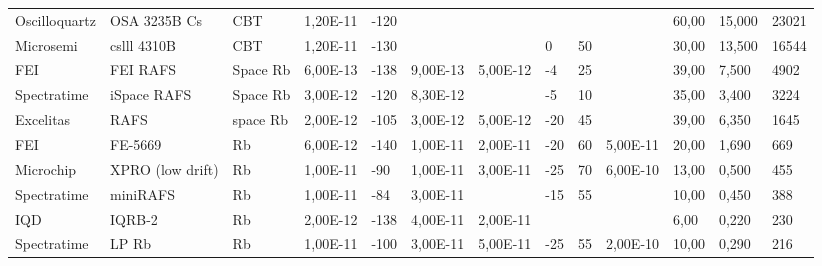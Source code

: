 \begin{table}
\begin{tabular}{ll|lllllllllll}
        Oscilloquartz   & OSA 3235B Cs     & CBT           & 1,20E-11      & -120       & ~              & ~                & ~             & ~             & ~               & 60,00          & 15,000          & 23021         \\
        Microsemi       & cslll 4310B      & CBT           & 1,20E-11      & -130       & ~              & ~                & 0             & 50            & ~               & 30,00          & 13,500          & 16544         \\
        FEI             & FEI RAFS         & Space Rb      & 6,00E-13      & -138       & 9,00E-13       & 5,00E-12         & -4            & 25            & ~               & 39,00          & 7,500           & 4902          \\
        Spectratime     & iSpace RAFS      & Space Rb      & 3,00E-12      & -120       & 8,30E-12       & ~                & -5            & 10            & ~               & 35,00          & 3,400           & 3224          \\
        Excelitas       & RAFS             & space Rb      & 2,00E-12      & -105       & 3,00E-12       & 5,00E-12         & -20           & 45            & ~               & 39,00          & 6,350           & 1645          \\
        FEI             & FE-5669          & Rb            & 6,00E-12      & -140       & 1,00E-11       & 2,00E-11         & -20           & 60            & 5,00E-11        & 20,00          & 1,690           & 669           \\
        Microchip       & XPRO (low drift) & Rb            & 1,00E-11      & -90        & 1,00E-11       & 3,00E-11         & -25           & 70            & 6,00E-10        & 13,00          & 0,500           & 455           \\
        Spectratime     & miniRAFS         & Rb            & 1,00E-11      & -84        & 3,00E-11       & ~                & -15           & 55            & ~               & 10,00          & 0,450           & 388           \\
        IQD             & IQRB-2           & Rb            & 2,00E-12      & -138       & 4,00E-11       & 2,00E-11         & ~             & ~             & ~               & 6,00           & 0,220           & 230           \\
        Spectratime     & LP Rb            & Rb            & 1,00E-11      & -100       & 3,00E-11       & 5,00E-11         & -25           & 55            & 2,00E-10        & 10,00          & 0,290           & 216           \\

\end{tabular}
\end{table}
